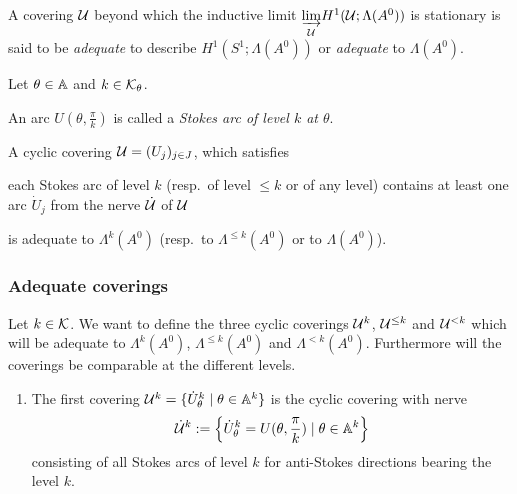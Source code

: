 \begin{defn}
  A covering $\mathcal{U}$ beyond which the inductive limit
  $\underset{\mathcal{U}}{\underrightarrow{\lim}}H^1(\mathcal{U};\Lambda(A^0))$ is stationary
  is said to be \emph{adequate} to describe $H^1(S^1;\Lambda(A^0))$ or
  \emph{adequate} to $\Lambda(A^0)$.
\end{defn}

\begin{prop}\label{prop:adeqCovCondition}
  Let $\theta\in\mathbb{A}$ and $k\in\mathcal{K}_\theta$.
  \begin{s-defn}
    An arc $U(\theta,\frac{\pi}{k})$ is called a \emph{Stokes arc of level $k$
    at $\theta$}.
  \end{s-defn}
  A cyclic covering $\mathcal{U}=(U_j)_{j\in J}$, which satisfies
  \begin{einr}
    each Stokes arc of level $k$ (resp.\ of level $\leq k$ or of any level)
    contains at least one arc $\dot U_j$ from the nerve $\dot{\mathcal{U}}$ of $\mathcal{U}$
  \end{einr}
  is adequate to $\Lambda^k(A^0)$ (resp.\ to $\Lambda^{\leq k}(A^0)$ or to
  $\Lambda(A^0)$).
\end{prop}
\begin{comment}
  \begin{proof}
    \TODO{}
  \end{proof}
\end{comment}

\subsubsection{Adequate coverings}
Let $k\in\mathcal{K}$.
We want to define the three cyclic coverings $\mathcal{U}^{k}$, $\mathcal{U}^{\leq k}$ and
$\mathcal{U}^{<k}$ which will be adequate to $\Lambda^k(A^0)$, $\Lambda^{\leq k}(A^0)$
and $\Lambda^{<k}(A^0)$. Furthermore will the coverings be comparable at the
different levels.

\begin{enumerate}
  \item The first covering $\mathcal{U}^{k}=\{\dot U_\theta^k\mid\theta\in\mathbb{A}^k\}$
    is the cyclic covering with nerve
    \[
      \dot{\mathcal{U}}^k:=
      \left\{\dot U_\theta^k=U(\theta,\frac{\pi}{k})\mid\theta\in\mathbb{A}^k\right\}
    \]
    consisting of all Stokes arcs of level $k$ for anti-Stokes directions
    bearing the level $k$.
\end{enumerate}

